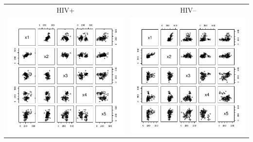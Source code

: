 \documentclass[a4paper,11pt]{article}
\begin{document}
\begin{center}
\begin{tabular}{cc}
HIV+ & HIV-- \\
\includegraphics{prim-007}
&
\includegraphics{prim-008}
\end{tabular}
\end{center}
\end{document}
